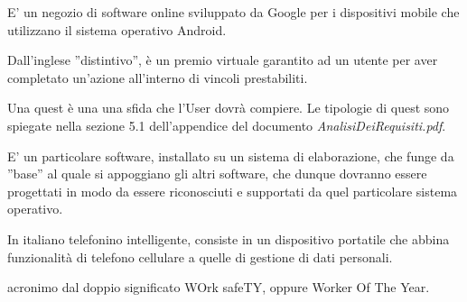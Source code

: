 E' un negozio di software online sviluppato da Google per i dispositivi mobile che utilizzano il sistema operativo Android.


Dall'inglese ''distintivo'', è un premio virtuale garantito ad un utente per aver completato un'azione all'interno di vincoli prestabiliti.



{Una quest è una una sfida che l'User dovrà compiere. Le tipologie di quest sono spiegate nella sezione 5.1 dell'appendice del documento \emph{AnalisiDeiRequisiti.pdf}.}

E' un particolare software, installato su un sistema di elaborazione, che funge da ''base'' al quale si appoggiano gli altri software, che dunque dovranno essere progettati in modo da essere riconosciuti e supportati da quel particolare sistema operativo.

In italiano telefonino intelligente, consiste in un dispositivo portatile che abbina funzionalità di telefono cellulare a quelle di gestione di dati personali.


acronimo dal doppio significato WOrk safeTY, oppure Worker Of The Year.

